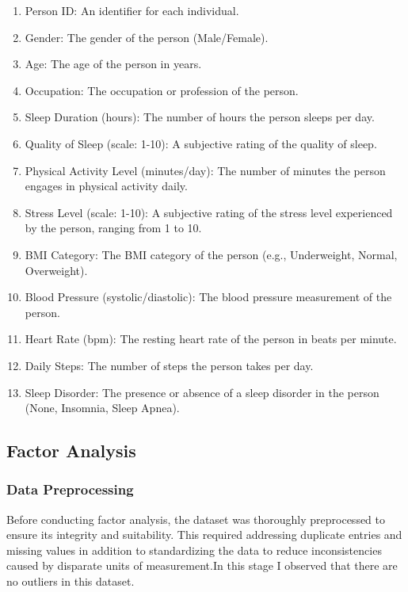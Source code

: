 \documentclass[11pt]{article}
\begin{document}
		\begin{enumerate}
			\item Person ID: An identifier for each individual.
			\item Gender: The gender of the person (Male/Female).
			\item Age: The age of the person in years.
			\item Occupation: The occupation or profession of the person.
			\item Sleep Duration (hours): The number of hours the person sleeps per day.
			\item Quality of Sleep (scale: 1-10): A subjective rating of the quality of sleep.
			\item Physical Activity Level (minutes/day): The number of minutes the person engages in physical activity daily.
			\item Stress Level (scale: 1-10): A subjective rating of the stress level experienced by the person, ranging from 1 to 10.
			\item BMI Category: The BMI category of the person (e.g., Underweight, Normal, Overweight).
			\item Blood Pressure (systolic/diastolic): The blood pressure measurement of the person.
			\item Heart Rate (bpm): The resting heart rate of the person in beats per minute.
			\item Daily Steps: The number of steps the person takes per day.
			\item Sleep Disorder: The presence or absence of a sleep disorder in the person (None, Insomnia, Sleep Apnea).
		\end{enumerate}
		
		\subsection{Factor Analysis}
			\subsubsection{Data Preprocessing}
			Before conducting factor analysis, the dataset was thoroughly preprocessed to ensure its integrity and suitability. This required addressing duplicate entries and missing values in addition to standardizing the data to reduce inconsistencies caused by disparate units of measurement.In this stage I observed that there are no outliers in this dataset.
		
\end{document}
